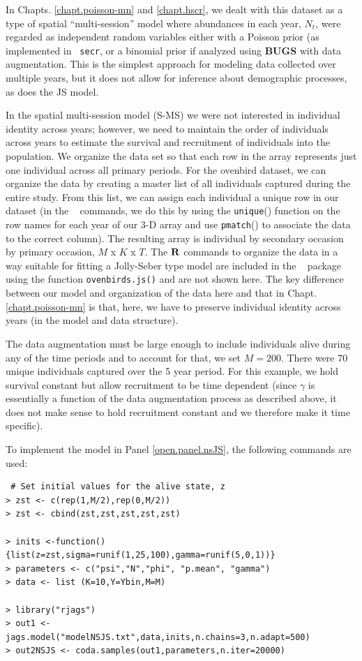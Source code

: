 In Chapts. \ref{chapt.poisson-mn} and \ref{chapt.hscr}, we dealt with
this dataset as a type of spatial ``multi-session'' model where
abundances in each year, $N_{t}$, were regarded as independent random
variables either with a Poisson prior (as implemented in \mbox{\tt
  secr}, or a binomial prior if analyzed using {\bf BUGS} with data
augmentation.  This is the simplest approach for modeling data
collected over multiple years, but it does not allow for inference
about demographic processes, as does the JS model.

In the spatial multi-session model (S-MS) we were not interested in
individual identity across years; however, we need to maintain the
order of individuals across years to estimate the survival and
recruitment of individuals into the population.  We organize the data
set so that each row in the array represents just one individual
across all primary periods.  For the ovenbird dataset, we can organize
the data by creating a master list of all individuals captured during
the entire study.  From this list, we can assign each individual a
unique row in our dataset (in the \R~ commands, we do this by using
the \mbox{\tt unique}() function on the row names for each year of our
3-D array and use \mbox{\tt pmatch}() to associate the data to the
correct column).  The resulting array is individual by secondary
occasion by primary occasion, $M$ x $K$ x $T$.  The ${\bf R}$ commands
to organize the data in a way suitable for fitting a Jolly-Seber type
model are included in the \scrbook~ package using the function
\verb+ovenbirds.js()+ and are not shown here.  The key difference
between our model and organization of the data here and that in
Chapt. \ref{chapt.poisson-mn} is that, here, we have to preserve
individual identity across years (in the model and data structure).

The data augmentation must be large enough to include individuals
alive during any of the time periods and to account for that, we set
$M=200$.  There were 70 unique individuals captured over the 5 year
period.  For this example, we hold survival constant but allow
recruitment to be time dependent (since $\gamma$ is essentially a
function of the data augmentation process as described above, it does
not make sense to hold recruitment constant and we therefore make it
time specific).

To implement the model in Panel \ref{open.panel.nsJS}, the following commands
are used:

{\small
\begin{verbatim}
 # Set initial values for the alive state, z
> zst <- c(rep(1,M/2),rep(0,M/2))
> zst <- cbind(zst,zst,zst,zst,zst)

> inits <-function(){list(z=zst,sigma=runif(1,25,100),gamma=runif(5,0,1))}
> parameters <- c("psi","N","phi", "p.mean", "gamma")
> data <- list (K=10,Y=Ybin,M=M)

> library("rjags")
> out1 <- jags.model("modelNSJS.txt",data,inits,n.chains=3,n.adapt=500)
> out2NSJS <- coda.samples(out1,parameters,n.iter=20000)
\end{verbatim}
}

